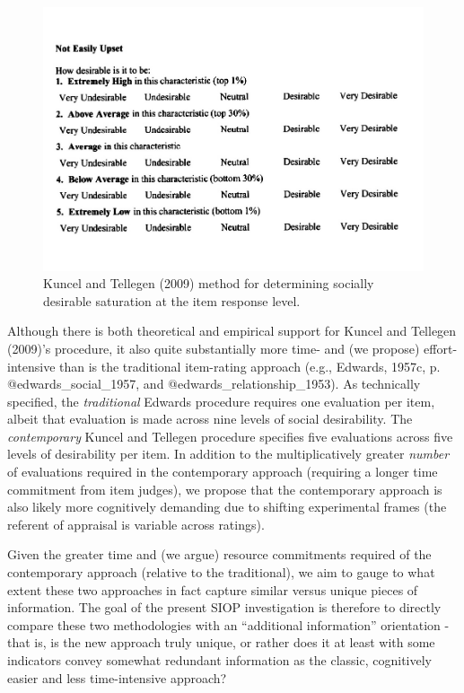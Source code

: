 \documentclass[
  english,
  ,jou]{apa6}
\begin{document}
\begin{figure}
\centering
\includegraphics{KuncelTellegen_files/figure-latex/Figure1-1.pdf}
\caption{\label{fig:Figure1}Kuncel and Tellegen (2009) method for determining socially desirable saturation at the item response level.}
\end{figure}

Although there is both theoretical and empirical support for Kuncel and Tellegen (2009)'s procedure, it also quite substantially more time- and (we propose) effort-intensive than is the traditional item-rating approach (e.g., Edwards, 1957c, p. @edwards\_social\_1957, and @edwards\_relationship\_1953). As technically specified, the \emph{traditional} Edwards procedure requires one evaluation per item, albeit that evaluation is made across nine levels of social desirability. The \emph{contemporary} Kuncel and Tellegen procedure specifies five evaluations across five levels of desirability per item. In addition to the multiplicatively greater \emph{number} of evaluations required in the contemporary approach (requiring a longer time commitment from item judges), we propose that the contemporary approach is also likely more cognitively demanding due to shifting experimental frames (the referent of appraisal is variable across ratings).

Given the greater time and (we argue) resource commitments required of the contemporary approach (relative to the traditional), we aim to gauge to what extent these two approaches in fact capture similar versus unique pieces of information. The goal of the present SIOP investigation is therefore to directly compare these two methodologies with an \enquote{additional information} orientation - that is, is the new approach truly unique, or rather does it at least with some indicators convey somewhat redundant information as the classic, cognitively easier and less time-intensive approach?
\end{document}
